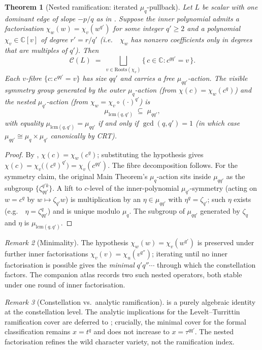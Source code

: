 \documentclass[aip,jmp,preprint,amsmath,amssymb,nofootinbib,floatfix]{revtex4-2}
\theoremstyle{plain}
\newtheorem{theorem}{Theorem}[section]
\theoremstyle{definition}
\theoremstyle{remark}
\newtheorem{remark}[theorem]{Remark}
\newcommand{\Roots}{\mathrm{Roots}}
\newcommand{\Cl}{\mathcal{C}}
\newcommand{\ie}{i.e.\ }
\newcommand{\eg}{e.g.\ }
\begin{document}
\begin{theorem}[Nested ramification: iterated $\mu_q$-pullback]\label{thm:N1}
Let $L$ be scalar with one dominant edge of slope $-p/q$ as in
. Suppose the inner polynomial admits a factorisation
$\chi_w(w) = \chi_v(w^{q'})$ for some integer $q' \ge 2$ and a polynomial
$\chi_v \in \mathbb{C}[v]$ of degree $r' = r / q'$ (\ie\ $\chi_w$ has
nonzero coefficients only in degrees that are multiples of $q'$). Then
\[
   \Cl(L) \;=\; \bigsqcup_{v \in \Roots(\chi_v)}
            \big\{\, c \in \mathbb{C} : c^{qq'} = v \,\big\}.
\]
Each $v$-fibre $\{c : c^{qq'} = v\}$ has size $qq'$ and carries a free
$\mu_{qq'}$-action. The \emph{visible} symmetry group generated by the
outer $\mu_q$-action (from $\chi(c) = \chi_w(c^q)$) and the nested
$\mu_{q'}$-action (from $\chi_w = \chi_v \circ (\cdot)^{q'}$) is
\[
   \mu_{\mathrm{lcm}(q, q')} \;\subseteq\; \mu_{qq'},
\]
with equality $\mu_{\mathrm{lcm}(q, q')} = \mu_{qq'}$ if and only if
$\gcd(q, q') = 1$ (in which case $\mu_{qq'} \cong \mu_q \times \mu_{q'}$
canonically by CRT).
\end{theorem}

\begin{proof}
By , $\chi(c) = \chi_w(c^q)$; substituting the hypothesis
gives $\chi(c) = \chi_v\big((c^q)^{q'}\big) = \chi_v(c^{qq'})$. The fibre
decomposition follows. For the symmetry claim, the original Main
Theorem's $\mu_q$-action sits inside $\mu_{qq'}$ as the subgroup
$\{\zeta_{qq'}^{q' k}\}$. A lift to $c$-level of the inner-polynomial
$\mu_{q'}$-symmetry (acting on $w = c^q$ by $w \mapsto \zeta_{q'} w$) is
multiplication by an $\eta \in \mu_{qq'}$ with $\eta^q = \zeta_{q'}$;
such $\eta$ exists (\eg\ $\eta = \zeta_{qq'}^q$) and is unique modulo
$\mu_q$. The subgroup of $\mu_{qq'}$ generated by $\zeta_q$ and $\eta$
is $\mu_{\mathrm{lcm}(q, q')}$.
\end{proof}

\begin{remark}[Minimality]\label{rem:N1-min}
The hypothesis $\chi_w(w) = \chi_v(w^{q'})$ is preserved under further
inner factorisations $\chi_v(v) = \chi_u(v^{q''})$; iterating until no
inner factorisation is possible gives the \emph{minimal} $q' q'' \cdots$
through which the constellation factors. The companion atlas
\cite{wkb_dataset_v1} records two such nested operators, both stable
under one round of inner factorisation.
\end{remark}

\begin{remark}[Constellation vs.\ analytic ramification]\label{rem:N1-analytic}
 is a purely algebraic identity at the constellation level.
The analytic implications for the Levelt--Turrittin ramification cover are
deferred to ; crucially, the minimal cover for the formal
classification remains $x = t^q$ and does not increase to $x = \tau^{qq'}$.
The nested factorisation refines the wild character variety, not the
ramification index.
\end{remark}
\end{document}
